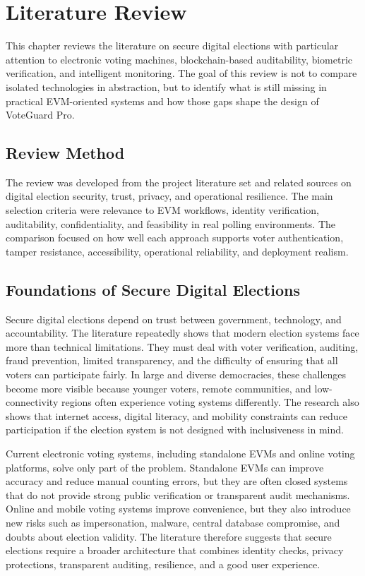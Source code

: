 \chapter{Literature Review}

This chapter reviews the literature on secure digital elections with particular attention to electronic voting machines, blockchain-based auditability, biometric verification, and intelligent monitoring. The goal of this review is not to compare isolated technologies in abstraction, but to identify what is still missing in practical EVM-oriented systems and how those gaps shape the design of VoteGuard Pro.

\section{Review Method}
The review was developed from the project literature set and related sources on digital election security, trust, privacy, and operational resilience. The main selection criteria were relevance to EVM workflows, identity verification, auditability, confidentiality, and feasibility in real polling environments. The comparison focused on how well each approach supports voter authentication, tamper resistance, accessibility, operational reliability, and deployment realism.

\section{Foundations of Secure Digital Elections}
Secure digital elections depend on trust between government, technology, and accountability. The literature repeatedly shows that modern election systems face more than technical limitations. They must deal with voter verification, auditing, fraud prevention, limited transparency, and the difficulty of ensuring that all voters can participate fairly. In large and diverse democracies, these challenges become more visible because younger voters, remote communities, and low-connectivity regions often experience voting systems differently. The research also shows that internet access, digital literacy, and mobility constraints can reduce participation if the election system is not designed with inclusiveness in mind.

Current electronic voting systems, including standalone EVMs and online voting platforms, solve only part of the problem. Standalone EVMs can improve accuracy and reduce manual counting errors, but they are often closed systems that do not provide strong public verification or transparent audit mechanisms. Online and mobile voting systems improve convenience, but they also introduce new risks such as impersonation, malware, central database compromise, and doubts about election validity. The literature therefore suggests that secure elections require a broader architecture that combines identity checks, privacy protections, transparent auditing, resilience, and a good user experience.

